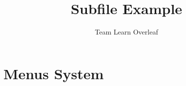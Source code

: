 \documentclass{article}
\title{Subfile Example}
\author{Team Learn Overleaf}
\date{ }
\begin{document}
 
\maketitle
 
\section{Menus System}
 

 
 
\end{document}
